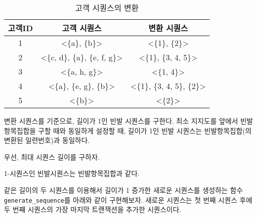 \documentclass[
]{book}
\newenvironment{Shaded}{\begin{snugshade}}{\end{snugshade}}
\newcommand{\AttributeTok}[1]{\textcolor[rgb]{0.77,0.63,0.00}{#1}}
\newcommand{\DecValTok}[1]{\textcolor[rgb]{0.00,0.00,0.81}{#1}}
\newcommand{\FunctionTok}[1]{\textcolor[rgb]{0.00,0.00,0.00}{#1}}
\newcommand{\NormalTok}[1]{#1}
\newcommand{\OtherTok}[1]{\textcolor[rgb]{0.56,0.35,0.01}{#1}}
\newcommand{\SpecialCharTok}[1]{\textcolor[rgb]{0.00,0.00,0.00}{#1}}
\newcommand{\StringTok}[1]{\textcolor[rgb]{0.31,0.60,0.02}{#1}}
\begin{document}
\begin{table}

\caption{\label{tab:association-transformed-sequence}고객 시퀀스의 변환}
\centering
\begin{tabular}[t]{ccc}
\toprule
고객ID & 고객 시퀀스 & 변환 시퀀스\\
\midrule
1 & <\{a\}, \{b\}> & <\{1\}, \{2\}>\\
2 & <\{c, d\}, \{a\}, \{e, f, g\}> & <\{1\}, \{3, 4, 5\}>\\
3 & <\{a, h, g\}> & <\{1, 4\}>\\
4 & <\{a\}, \{e, g\}, \{b\}> & <\{1\}, \{3, 4, 5\}, \{2\}>\\
5 & <\{b\}> & <\{2\}>\\
\bottomrule
\end{tabular}
\end{table}

변환 시퀀스를 기준으로, 길이가 1인 빈발 시퀀스를 구한다. 최소 지지도를 앞에서 빈발항목집합을 구할 때와 동일하게 설정할 때, 길이가 1인 빈발 시퀀스는 빈발항목집합(의 변환된 일련번호)과 동일하다.

우선, 최대 시퀀스 길이를 구하자.

\begin{Shaded}
\end{Shaded}

1-시퀀스인 빈발시퀀스는 빈발항목집합과 같다.

\begin{Shaded}
\end{Shaded}

같은 길이의 두 시퀀스를 이용해서 길이가 1 증가한 새로운 시퀀스를 생성하는 함수 \texttt{generate\_sequence}를 아래와 같이 구현해보자. 새로운 시퀀스는 첫 번째 시퀀스 후에 두 번째 시퀀스의 가장 마지막 트랜잭션을 추가한 시퀀스이다.
\end{document}
